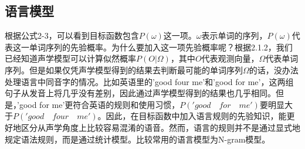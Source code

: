 \subsection{语言模型}
根据公式2-3，可以看到目标函数包含$P(\omega)$这一项。$\omega$表示单词的序列，$P(\omega)$代表这一单词序列的先验概率。为什么要加入这一项先验概率呢？根据2.1.2，我们已经知道声学模型可以计算似然概率$P(O|\Omega)$，其中$O$代表观测向量，$\Omega$代表单词序列。但是如果仅凭声学模型得到的结果去判断最可能的单词序列$\Omega$的话，没办法处理语言中同音字的情况。比如英语里的'good four me'和'good for me'，这两组句子从发音上将几乎没有差别，因此通过声学模型得到的结果也几乎相同。但是，'good for me'更符合英语的规则和使用习惯，$P('good\quad for\quad me')$要明显大于$P('good\quad four\quad me')$。因此，在目标函数中加入语言规则的先验知识，能更好地区分从声学角度上比较容易混淆的语音。然而，语言的规则并不是通过显式地规定语法规则，而是通过统计模型。比较常用的语言模型为N-gram模型。

